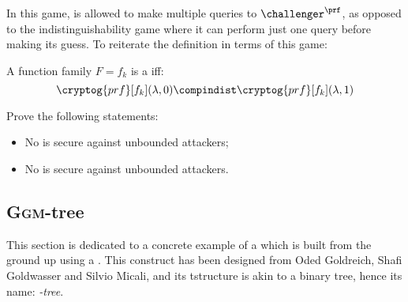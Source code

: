 In this game, \adversary{} is allowed to make multiple queries to $\challenger^\prf$, as opposed to the \prg{} indistinguishability game where it can perform just one query before making its guess. To reiterate the \prf{} definition in terms of this game:

\begin{definition}
    A function family $F = f_k$ is a \prf{} iff: 
    \[
        \cryptog{prf}[f_k](\lambda, 0) \compindist \cryptog{prf}[f_k](\lambda, 1)
    \]
\end{definition}

\begin{exercise}
    Prove the following statements:
    \begin{itemize}
        \item No \prg{} is secure against unbounded attackers;
        \item No \prf{} is secure against unbounded attackers.
    \end{itemize}
   
\end{exercise}


\subsection{\textsc{Ggm}-tree}

This section is dedicated to a concrete example of a \prf{} which is built from the ground up using a \prg. This construct has been designed from Oded Goldreich, Shafi Goldwasser and Silvio Micali, and its tstructure is akin to a binary tree, hence its name: \emph{\ggm-tree}.

